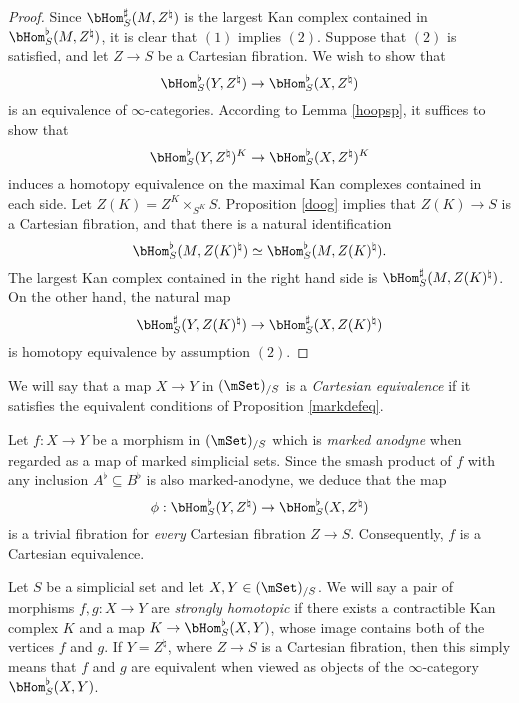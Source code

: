 \begin{proof}
Since $\bHom^{\sharp}_{S}(M,Z^{\natural})$ is the largest Kan complex contained in 
$\bHom^{\flat}_{S}(M, Z^{\natural})$, it is clear that $(1)$ implies $(2)$. Suppose that $(2)$ is satisfied, and let $Z \rightarrow S$ be a Cartesian fibration. We wish to show that
$$ \bHom^{\flat}_{S}(Y, Z^{\natural}) \rightarrow \bHom^{\flat}_{S}(X, Z^{\natural})$$
is an equivalence of $\infty$-categories. According to Lemma \ref{hoopsp}, it suffices to show that
$$ \bHom^{\flat}_{S}(Y, Z^{\natural})^K \rightarrow \bHom^{\flat}_{S}(X, Z^{\natural})^K$$ 
induces a homotopy equivalence on the maximal Kan complexes contained in each side.
Let $Z(K) = Z^K \times_{S^K} S$. Proposition \ref{doog} implies that $Z(K) \rightarrow S$
is a Cartesian fibration, and that there is a natural identification
$$ \bHom^{\flat}_{S}(M, Z(K)^{\natural}) \simeq \bHom^{\flat}_{S}(M, Z(K)^{\natural}).$$
The largest Kan complex contained in the right hand side is $\bHom^{\sharp}_{S}(M,Z(K)^{\natural})$. On the other hand, the natural map
$$ \bHom^{\sharp}_{S}(Y,Z(K)^{\natural}) \rightarrow \bHom^{\sharp}_{S}(X, Z(K)^{\natural})$$ is homotopy equivalence by assumption $(2)$.
\end{proof}

We will say that a map $X \rightarrow Y$ in $(\mSet)_{/S}$ is a {\it Cartesian equivalence} if it satisfies the equivalent conditions of Proposition \ref{markdefeq}.

\begin{remark}
Let $f: X \rightarrow Y$ be a morphism in $(\mSet)_{/S}$ which is {\em marked anodyne} when regarded as a map of marked simplicial sets. Since the smash product of $f$ with any inclusion $A^{\flat} \subseteq B^{\flat}$ is also marked-anodyne, we deduce that the map
$$ \phi: \bHom^{\flat}_{S}(Y, Z^{\natural}) \rightarrow \bHom^{\flat}_{S}(X, Z^{\natural})$$ is a trivial fibration for {\em every} Cartesian fibration $Z \rightarrow S$. Consequently, $f$ is a Cartesian equivalence.
\end{remark}

Let $S$ be a simplicial set and let $X,Y \in (\mSet)_{/S}$. We will say a pair of morphisms
$f,g: X \rightarrow Y$ are {\it strongly homotopic} if there exists a contractible Kan complex
$K$ and a map $K \rightarrow \bHom^{\flat}_{S}(X,Y)$, whose image contains both of the vertices $f$ and $g$. If $Y = Z^{\natural}$, where $Z \rightarrow S$ is a Cartesian fibration, then this simply means that $f$ and $g$ are equivalent when viewed as objects of the $\infty$-category $\bHom^{\flat}_{ S}(X,Y)$.

